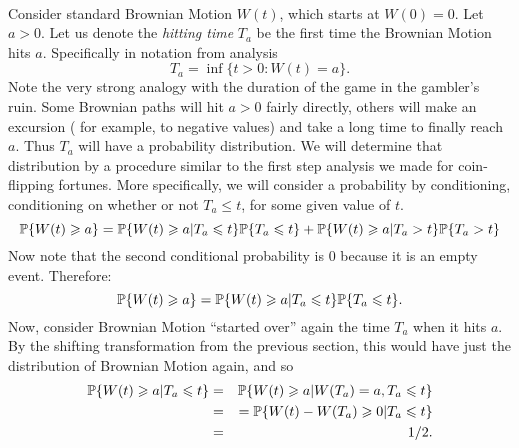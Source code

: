 \begin{problem}
  \\
  Consider standard Brownian Motion $W(t)$, which starts at $W(0) = 0.$
  Let $ a > 0 $.  Let us denote the \emph{hitting time} $ T_a $ be the
  first time the Brownian Motion hits $ a $.  Specifically in notation
  from analysis
  $$
    T_a = \inf \{t > 0 :  W(t) = a \}.
  $$
  Note the very strong analogy with the duration of the game in the
  gambler's ruin. Some Brownian paths will hit $a>0$ fairly directly,
  others will make an excursion ( for example, to negative values) and take
  a long time to finally reach $a$. Thus $T_a$ will have a probability
  distribution. We will determine that distribution by a procedure similar
  to the first step analysis we made for coin-flipping fortunes. More specifically,
  we will consider a probability by conditioning, conditioning on whether or not
  $T_a \le t$, for some given value of $t$.
  $$
    \P\{W(t) \ge a\} = \P\{ W(t) \ge a | T_a \le t\} \P\{T_a \le t\} +
    \P\{W(t) \ge a | T_a > t\} \P\{T_a > t\}
  $$
  Now note that the second conditional probability is $0$ because it is
  an empty event.  Therefore:
  $$
    \P\{ W(t) \ge a\} = \P\{ W(t) \ge a | T_a \le t\} \P\{T_a \le t\}.
  $$
  Now, consider Brownian Motion ``started over'' again the time $T_a$
  when it hits $a$.  By the shifting transformation from the previous
  section, this would have just the distribution of Brownian Motion again,
  and so
  \begin{eqnarray*}
    \P\{ W(t) \ge a | T_a \le t\} &=& \P\{ W(t) \ge a | W(T_a)=a,T_a\le t\} \\
    &=&= \P\{ W(t) - W(T_a) \ge 0 | T_a \le t\} \\
    &=& 1/2.
  \end{eqnarray*}


\end{problem}
